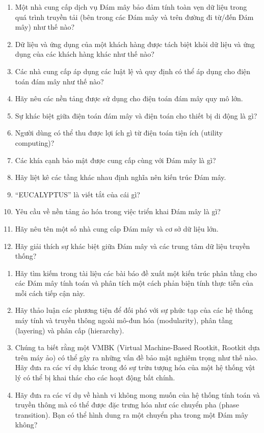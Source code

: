 \begin{enumerate}
  \item Một nhà cung cấp dịch vụ Đám mây bảo đảm tính toàn vẹn dữ liệu trong quá trình truyền tải (bên trong các Đám mây và trên đường đi từ/đến Đám mây) như thế nào?
  \item Dữ liệu và ứng dụng của một khách hàng được tách biệt khỏi dữ liệu và ứng dụng của các khách hàng khác như thế nào?
  \item Các nhà cung cấp áp dụng các luật lệ và quy định có thể áp dụng cho điện toán đám mây như thế nào?
  \item Hãy nêu các nền tảng được sử dụng cho điện toán đám mây quy mô lớn.
  \item Sự khác biệt giữa điện toán đám mây và điện toán cho thiết bị di động là gì?
  \item Người dùng có thể thu được lợi ích gì từ điện toán tiện ích (utility computing)?
  \item Các khía cạnh bảo mật được cung cấp cùng với Đám mây là gì?
  \item Hãy liệt kê các tầng khác nhau định nghĩa nên kiến trúc Đám mây.
  \item ``EUCALYPTUS'' là viết tắt của cái gì?
  \item Yêu cầu về nền tảng ảo hóa trong việc triển khai Đám mây là gì?
  \item Hãy nêu tên một số nhà cung cấp Đám mây và cơ sở dữ liệu lớn.
  \item Hãy giải thích sự khác biệt giữa Đám mây và các trung tâm dữ liệu truyền thống?
\end{enumerate}


\begin{enumerate}
  \item Hãy tìm kiếm trong tài liệu các bài báo đề xuất một kiến trúc phân tầng cho các Đám mây tính toán và phân tích một cách phản biện tính thực tiễn của mỗi cách tiếp cận này.
  \item Hãy thảo luận các phương tiện để đối phó với sự phức tạp của các hệ thống máy tính và truyền thông ngoài mô-đun hóa (modularity), phân tầng (layering) và phân cấp (hierarchy).
  \item Chúng ta biết rằng một VMBK (Virtual Machine-Based Rootkit, Rootkit dựa trên máy ảo) có thể gây ra những vấn đề bảo mật nghiêm trọng như thế nào. Hãy đưa ra các ví dụ khác trong đó sự trừu tượng hóa của một hệ thống vật lý có thể bị khai thác cho các hoạt động bất chính.
  \item Hãy đưa ra các ví dụ về hành vi không mong muốn của hệ thống tính toán và truyền thông mà có thể được đặc trưng hóa như các chuyển pha (phase transition). Bạn có thể hình dung ra một chuyển pha trong một Đám mây không?
\end{enumerate}


